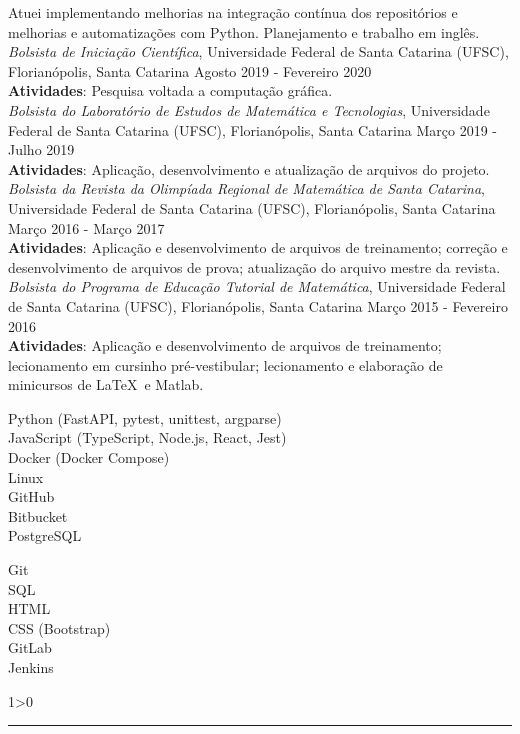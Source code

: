 \documentclass[a4paper,10pt]{article}
\newcommand{\criaSecao}[4][0]{
	\begin{tcolorbox}[
        blanker,
        breakable,
        title=\begin{minipage}{0.16\linewidth}\large{\textbf{#2}}\vspace{-#3\baselineskip}\end{minipage},
        coltitle=black,
        leftupper=0.21\linewidth,
    ]
        #4
		\ifnum0#1>0 { \hrule {\ } } \fi
    \end{tcolorbox}
}
\begin{document}
{        Atuei implementando melhorias na integração contínua dos repositórios e melhorias e automatizações com Python. Planejamento e trabalho em inglês.\\

        \textit{Bolsista de Iniciação Científica}, Universidade Federal de Santa Catarina (UFSC), Florianópolis, Santa Catarina \hfill Agosto 2019 - Fevereiro 2020 \\
		\textbf{Atividades}: Pesquisa voltada a computação gráfica.\\

		\textit{Bolsista do Laboratório de Estudos de Matemática e Tecnologias}, Universidade Federal de Santa Catarina (UFSC), Florianópolis, Santa Catarina \hfill Março 2019 - Julho 2019 \\
		\textbf{Atividades}: Aplicação, desenvolvimento e atualização de arquivos do projeto.\\

		\textit{Bolsista da Revista da Olimpíada Regional de Matemática de Santa Catarina}, Universidade Federal de Santa Catarina (UFSC), Florianópolis, Santa Catarina \hfill Março 2016 - Março 2017 \\
		\textbf{Atividades}: Aplicação e desenvolvimento de arquivos de treinamento; correção e desenvolvimento de arquivos de prova; atualização do arquivo mestre da revista.\\

		\textit{Bolsista do Programa de Educação Tutorial de Matemática}, Universidade Federal de Santa Catarina (UFSC), Florianópolis, Santa Catarina \hfill Março 2015 - Fevereiro 2016 \\
		\textbf{Atividades}: Aplicação e desenvolvimento de arquivos de treinamento; lecionamento em cursinho pré-vestibular; lecionamento e elaboração de minicursos de \LaTeX\ e Matlab. \\
    }

    \criaSecao[1]{Linguagens de programação e ferramentas}{4}{
        \large{\bf
			\begin{minipage}{0.65\linewidth}
				Python (FastAPI, pytest, unittest, argparse)\\
				JavaScript (TypeScript, Node.js, React, Jest)\\
				Docker (Docker Compose)\\
				Linux\\
				GitHub\\
				Bitbucket\\
				PostgreSQL\\
			\end{minipage}
			\begin{minipage}{0.35\linewidth}
				Git\\
				SQL\\
				HTML\\
				CSS (Bootstrap)\\
				GitLab\\
				Jenkins\\
				\vspace{\baselineskip}
			\end{minipage}
		}
    }
\end{document}
